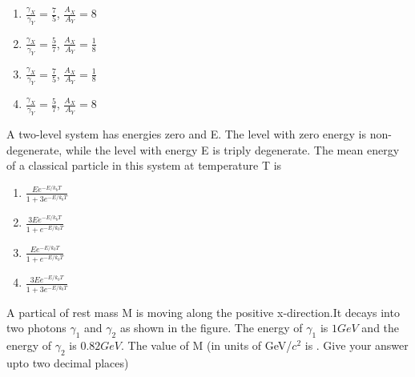 \begin{multicols}{2}
\begin{enumerate}
    \item $\frac{\gamma_X}{\gamma_Y}=\frac{7}{5}$, $\frac{A_X}{A_Y}=8$
    \item $\frac{\gamma_X}{\gamma_Y}=\frac{5}{7}$, $\frac{A_X}{A_Y}=\frac{1}{8}$
    \item $\frac{\gamma_X}{\gamma_Y}=\frac{7}{5}$, $\frac{A_X}{A_Y}=\frac{1}{8}$
    \item $\frac{\gamma_X}{\gamma_Y}=\frac{5}{7}$, $\frac{A_X}{A_Y}=8$
\end{enumerate}
\end{multicols}
\vspace{0.5cm}
\item A two-level system has energies zero and E. The level with zero energy is non-degenerate, while the level with energy E is triply degenerate. The mean energy of a classical particle in this system at temperature T is
\begin{multicols}{2}
    \begin{enumerate}
        \item $\frac{Ee^{-E/k_b T}}{1+3e^{-E/k_b T}}$
        \item $\frac{3Ee^{-E/k_b T}}{1+e^{-E/k_b T}}$
        \item $\frac{Ee^{-E/k_b T}}{1+e^{-E/k_b T}}$
        \item $\frac{3Ee^{-E/k_b T}}{1+3e^{-E/k_b T}}$
    \end{enumerate}
\end{multicols}

\vspace{0.5cm}
\item A partical of rest mass M is moving along the positive x-direction.It decays into two photons $\gamma_1$ and $\gamma_2$ as shown in the figure. The energy of $\gamma_1$ is $1GeV$ and the energy of $\gamma_2$ is $0.82 GeV$. The value of M (in units of GeV/$c^2$ is \underline{\hspace{2cm}}. Give your answer upto two decimal places)

